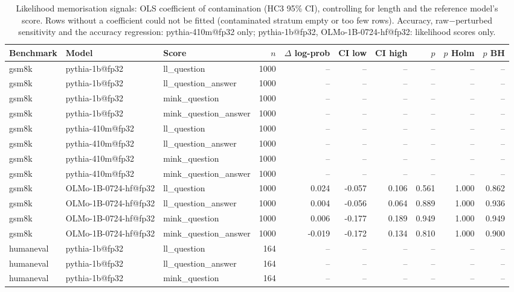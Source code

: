 \begin{table}[t]
\centering
\caption{Likelihood memorisation signals: OLS coefficient of contamination (HC3 95\% CI), controlling for length and the reference model's score. Rows without a coefficient could not be fitted (contaminated stratum empty or too few rows). Accuracy, raw$-$perturbed sensitivity and the accuracy regression: pythia-410m@fp32 only; pythia-1b@fp32, OLMo-1B-0724-hf@fp32: likelihood scores only. }
\label{tab:loglik}
\begin{tabular}{lllrrrrrrr}
\toprule
Benchmark & Model & Score & $n$ & $\Delta$ log-prob & CI low & CI high & $p$ & $p$ Holm & $p$ BH \\
\midrule
gsm8k & pythia-1b@fp32 & ll\_question & 1000 & -- & -- & -- & -- & -- & -- \\
gsm8k & pythia-1b@fp32 & ll\_question\_answer & 1000 & -- & -- & -- & -- & -- & -- \\
gsm8k & pythia-1b@fp32 & mink\_question & 1000 & -- & -- & -- & -- & -- & -- \\
gsm8k & pythia-1b@fp32 & mink\_question\_answer & 1000 & -- & -- & -- & -- & -- & -- \\
gsm8k & pythia-410m@fp32 & ll\_question & 1000 & -- & -- & -- & -- & -- & -- \\
gsm8k & pythia-410m@fp32 & ll\_question\_answer & 1000 & -- & -- & -- & -- & -- & -- \\
gsm8k & pythia-410m@fp32 & mink\_question & 1000 & -- & -- & -- & -- & -- & -- \\
gsm8k & pythia-410m@fp32 & mink\_question\_answer & 1000 & -- & -- & -- & -- & -- & -- \\
gsm8k & OLMo-1B-0724-hf@fp32 & ll\_question & 1000 & 0.024 & -0.057 & 0.106 & 0.561 & 1.000 & 0.862 \\
gsm8k & OLMo-1B-0724-hf@fp32 & ll\_question\_answer & 1000 & 0.004 & -0.056 & 0.064 & 0.889 & 1.000 & 0.936 \\
gsm8k & OLMo-1B-0724-hf@fp32 & mink\_question & 1000 & 0.006 & -0.177 & 0.189 & 0.949 & 1.000 & 0.949 \\
gsm8k & OLMo-1B-0724-hf@fp32 & mink\_question\_answer & 1000 & -0.019 & -0.172 & 0.134 & 0.810 & 1.000 & 0.900 \\
\midrule
humaneval & pythia-1b@fp32 & ll\_question & 164 & -- & -- & -- & -- & -- & -- \\
humaneval & pythia-1b@fp32 & ll\_question\_answer & 164 & -- & -- & -- & -- & -- & -- \\
humaneval & pythia-1b@fp32 & mink\_question & 164 & -- & -- & -- & -- & -- & -- \\

\end{tabular}
\end{table}
